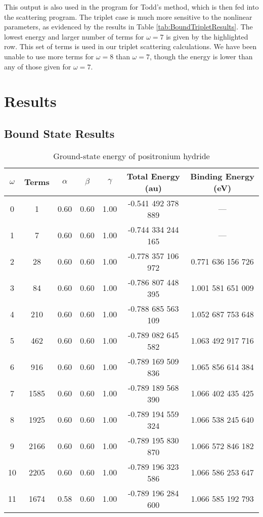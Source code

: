 \documentclass[Dissertation.tex]{subfiles}
\begin{document}
This output is also used in the program for Todd's method, which is then fed into the scattering program.  The triplet case is much more sensitive to the nonlinear parameters, as evidenced by the results in Table \ref{tab:BoundTripletResults}.  The lowest energy and larger number of terms for $\omega = 7$ is given by the highlighted row.  This set of terms is used in our triplet scattering calculations.  We have been unable to use more terms for $\omega = 8$ than $\omega = 7$, though the energy is lower than any of those given for $\omega = 7$.




\section{Results}
\subsection{Bound State Results}

\setlength{\abovecaptionskip}{6pt}   %
\setlength{\belowcaptionskip}{6pt}   %
\begin{table}[H]
\centering
\begin{tabular}{c c c c c c c}
\toprule
$\omega$ & Terms & $\alpha$ & $\beta$ & $\gamma$ & Total Energy (au) & Binding Energy (eV) \\ [0.5ex]
\midrule
0 & 1 & 0.60 & 0.60 & 1.00 & -0.541 492 378 889 & --- \\
1 & 7 & 0.60 & 0.60 & 1.00 & -0.744 334 244 165 & --- \\
2 & 28 & 0.60 & 0.60 & 1.00 & -0.778 357 106 972 & 0.771 636 156 726 \\
3 & 84 & 0.60 & 0.60 & 1.00 & -0.786 807 448 395 & 1.001 581 651 009 \\
4 & 210 & 0.60 & 0.60 & 1.00 & -0.788 685 563 109 & 1.052 687 753 648 \\
5 & 462 & 0.60 & 0.60 & 1.00 & -0.789 082 645 582 & 1.063 492 917 716 \\
6 & 916 & 0.60 & 0.60 & 1.00 & -0.789 169 509 836 & 1.065 856 614 384 \\
7 & 1585 & 0.60 & 0.60 & 1.00 & -0.789 189 568 390 & 1.066 402 435 425 \\
8 & 1925 & 0.60 & 0.60 & 1.00 & -0.789 194 559 324 & 1.066 538 245 640 \\
9 & 2166 & 0.60 & 0.60 & 1.00 & -0.789 195 830 870 & 1.066 572 846 182 \\
10 & 2205 & 0.60 & 0.60 & 1.00 & -0.789 196 323 586 & 1.066 586 253 647 \\
11 & 1674 & 0.58 & 0.60 & 1.00 & -0.789 196 284 600 & 1.066 585 192 793 \\
\bottomrule
\end{tabular}
\caption{Ground-state energy of positronium hydride} %
\label{tab:BoundEnergyOld}
\end{table}
\end{document}

